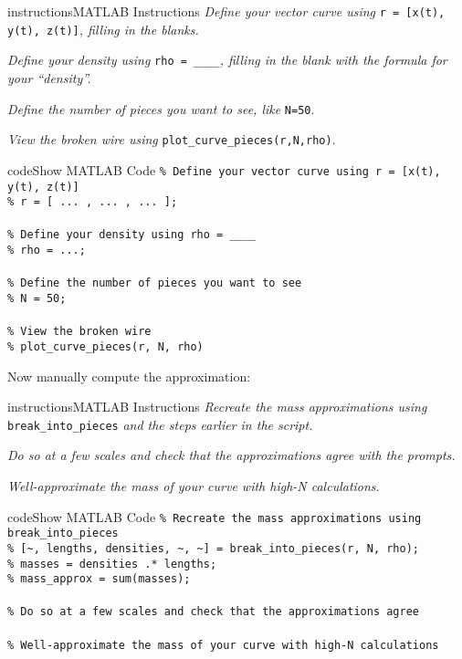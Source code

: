\documentclass{ximera}
\begin{document}
\begin{expandable}{instructions}{MATLAB Instructions}
\textit{Define your vector curve using} \texttt{r = [x(t), y(t), z(t)]}\textit{, filling in the blanks.}

\textit{Define your density using} \texttt{rho = \_\_\_\_}\textit{, filling in the blank with the formula for your ``density''.}

\textit{Define the number of pieces you want to see, like} \texttt{N=50}.

\textit{View the broken wire using} \texttt{plot\_curve\_pieces(r,N,rho)}.
\end{expandable}

\begin{expandable}{code}{Show MATLAB Code}
\texttt{\% Define your vector curve using r = [x(t), y(t), z(t)]}\\
\texttt{\% r = [\; ...\; , \; ...\; , \; ...\; ];}\\
\\
\texttt{\% Define your density using rho = \_\_\_\_}\\
\texttt{\% rho = ...;}\\
\\
\texttt{\% Define the number of pieces you want to see}\\
\texttt{\% N = 50;}\\
\\
\texttt{\% View the broken wire}\\
\texttt{\% plot\_curve\_pieces(r, N, rho)}
\end{expandable}

Now manually compute the approximation:

\begin{expandable}{instructions}{MATLAB Instructions}
\textit{Recreate the mass approximations using} \texttt{break\_into\_pieces} \textit{and the steps earlier in the script.}

\textit{Do so at a few scales and check that the approximations agree with the prompts.}

\textit{Well-approximate the mass of your curve with high-N calculations.}
\end{expandable}

\begin{expandable}{code}{Show MATLAB Code}
\texttt{\% Recreate the mass approximations using break\_into\_pieces}\\
\texttt{\% [\textasciitilde, lengths, densities, \textasciitilde, \textasciitilde] = break\_into\_pieces(r, N, rho);}\\
\texttt{\% masses = densities .* lengths;}\\
\texttt{\% mass\_approx = sum(masses);}\\
\\
\texttt{\% Do so at a few scales and check that the approximations agree}\\
\\
\texttt{\% Well-approximate the mass of your curve with high-N calculations}
\end{expandable}
\end{document}
